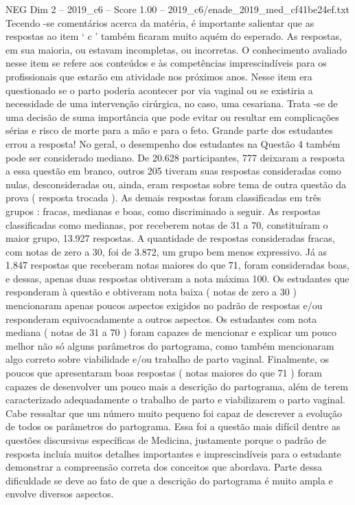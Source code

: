 \begin{textsample}{NEG Dim 2 – 2019\_c6 – Score 1.00 – 2019\_c6/enade\_2019\_med\_cf41be24ef.txt}
Tecendo -se comentários acerca da matéria, é importante salientar que as respostas ao item ‘ c ’ também ficaram muito aquém do esperado.
As respostas, em sua maioria, ou estavam incompletas, ou incorretas.
O conhecimento avaliado nesse item se refere aos conteúdos e às competências imprescindíveis para os profissionais que estarão em atividade nos próximos anos.
Nesse item era questionado se o parto poderia acontecer por via vaginal ou se existiria a necessidade de uma intervenção cirúrgica, no caso, uma cesariana.
Trata -se de uma decisão de suma importância que pode evitar ou resultar em complicações sérias e risco de morte para a mão e para o feto.
Grande parte dos estudantes errou a resposta!
No geral, o desempenho dos estudantes na Questão 4 também pode ser considerado mediano.
De 20.628 participantes, 777 deixaram a resposta a essa questão em branco, outros 205 tiveram suas respostas consideradas como nulas, desconsideradas ou, ainda, eram respostas sobre tema de outra questão da prova ( resposta trocada ).
As demais respostas foram classificadas em três grupos : fracas, medianas e boas, como discriminado a seguir.
As respostas classificadas como medianas, por receberem notas de 31 a 70, constituíram o maior grupo, 13.927 respostas.
A quantidade de respostas consideradas fracas, com notas de zero a 30, foi de 3.872, um grupo bem menos expressivo.
Já as 1.847 respostas que receberam notas maiores do que 71, foram consideradas boas, e dessas, apenas duas respostas obtiveram a nota máxima 100.
Os estudantes que responderam à questão e obtiveram nota baixa ( notas de zero a 30 ) mencionaram apenas poucos aspectos exigidos no padrão de respostas e/ou responderam equivocadamente a outros aspectos.
Os estudantes com nota mediana ( notas de 31 a 70 ) foram capazes de mencionar e explicar um pouco melhor não só alguns parâmetros do partograma, como também mencionaram algo correto sobre viabilidade e/ou trabalho de parto vaginal.
Finalmente, os poucos que apresentaram boas respostas ( notas maiores do que 71 ) foram capazes de desenvolver um pouco mais a descrição do partograma, além de terem caracterizado adequadamente o trabalho de parto e viabilizarem o parto vaginal.
Cabe ressaltar que um número muito pequeno foi capaz de descrever a evolução de todos os parâmetros do partograma.
Essa foi a questão mais difícil dentre as questões discursivas específicas de Medicina, justamente porque o padrão de resposta incluía muitos detalhes importantes e imprescindíveis para o estudante demonstrar a compreensão correta dos conceitos que abordava.
Parte dessa dificuldade se deve ao fato de que a descrição do partograma é muito ampla e envolve diversos aspectos.

\end{textsample}
